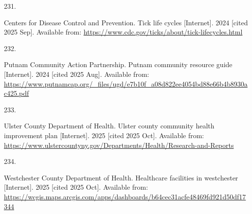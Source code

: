 \documentclass[
  english,
  letterpaper,
]{report}
\newlength{\cslhangindent}
\newlength{\csllabelwidth}
\newenvironment{CSLReferences}[2] %
 {\begin{list}{}{%
  \setlength{\itemindent}{0pt}
  \setlength{\leftmargin}{0pt}
  \setlength{\parsep}{0pt}
  \ifodd #1
   \setlength{\leftmargin}{\cslhangindent}
   \setlength{\itemindent}{-1\cslhangindent}
  \fi
  \setlength{\itemsep}{#2\baselineskip}}}
 {\end{list}}
\newcommand{\CSLLeftMargin}[1]{\parbox[t]{\csllabelwidth}{\strut#1\strut}}
\newcommand{\CSLRightInline}[1]{\parbox[t]{\linewidth - \csllabelwidth}{\strut#1\strut}}
\begin{document}
\begin{CSLReferences}{0}{1}
\CSLLeftMargin{231. }%
\CSLRightInline{Centers for Disease Control and Prevention. Tick life
cycles {[}Internet{]}. 2024 {[}cited 2025 Sep{]}. Available from:
\url{https://www.cdc.gov/ticks/about/tick-lifecycles.html}}

\CSLLeftMargin{232. }%
\CSLRightInline{Putnam Community Action Partnership. Putnam community
resource guide {[}Internet{]}. 2024 {[}cited 2025 Aug{]}. Available
from:
\url{https://www.putnamcap.org/_files/ugd/e7b10f_a08d822ee4054bd88e66b4b8930ac425.pdf}}

\CSLLeftMargin{233. }%
\CSLRightInline{Ulster County Department of Health. Ulster county
community health improvement plan {[}Internet{]}. 2025 {[}cited 2025
Oct{]}. Available from:
\url{https://www.ulstercountyny.gov/Departments/Health/Research-and-Reports}}

\CSLLeftMargin{234. }%
\CSLRightInline{Westchester County Department of Health. Healthcare
facilities in westchester {[}Internet{]}. 2025 {[}cited 2025 Oct{]}.
Available from:
\url{https://wcgis.maps.arcgis.com/apps/dashboards/b64cec31acfe48469fd921d50df17344}}

\end{CSLReferences}
\end{document}
